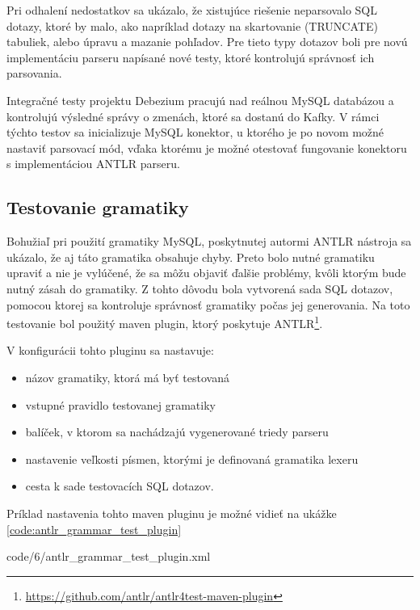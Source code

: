 Pri odhalení nedostatkov sa ukázalo, že xistujúce riešenie neparsovalo SQL dotazy, ktoré by malo, ako napríklad dotazy na skartovanie (TRUNCATE) tabuliek, alebo úpravu a mazanie pohľadov. Pre tieto typy dotazov boli pre novú implementáciu parseru napísané nové testy, ktoré kontrolujú správnosť ich parsovania.

Integračné testy projektu Debezium pracujú nad reálnou MySQL databázou a kontrolujú výsledné správy o zmenách, ktoré sa dostanú do Kafky. V rámci týchto testov sa inicializuje MySQL konektor, u ktorého je po novom možné nastaviť parsovací mód, vďaka ktorému je možné otestovať fungovanie konektoru s implementáciou ANTLR parseru.

\subsection{Testovanie gramatiky}
Bohužiaľ pri použití gramatiky MySQL, poskytnutej autormi ANTLR nástroja sa ukázalo, že aj táto gramatika obsahuje chyby. Preto bolo nutné gramatiku upraviť a nie je vylúčené, že sa môžu objaviť ďalšie problémy, kvôli ktorým bude nutný zásah do gramatiky. Z tohto dôvodu bola vytvorená sada SQL dotazov, pomocou ktorej sa kontroluje správnosť gramatiky počas jej generovania. Na toto testovanie bol použitý maven plugin, ktorý poskytuje ANTLR\footnote{\url{https://github.com/antlr/antlr4test-maven-plugin}}. 

V konfigurácii tohto pluginu sa nastavuje:

\begin{itemize}
\item názov gramatiky, ktorá má byť testovaná
\item vstupné pravidlo testovanej gramatiky
\item balíček, v ktorom sa nachádzajú vygenerované triedy parseru
\item nastavenie veľkosti písmen, ktorými je definovaná gramatika lexeru
\item cesta k sade testovacích SQL dotazov.
\end{itemize}

Príklad nastavenia tohto maven pluginu je možné vidieť na ukážke \ref{code:antlr_grammar_test_plugin}


            {code/6/antlr_grammar_test_plugin.xml}

